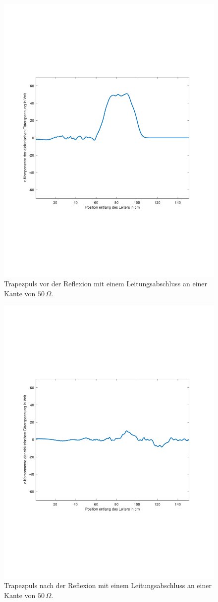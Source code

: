\documentclass[Protokollheft.tex]{subfiles}
\begin{document}
\begin{figure}[ht]
	\centering
	\includegraphics[trim = 20mm 65mm 20mm 65mm, clip,width=0.7\linewidth]{Aufgabe2_1.pdf}
	\caption{Trapezpuls vor der Reflexion mit einem Leitungsabschluss an einer Kante von $50\,\Omega$.}\label{fig:Aufg2_1}
\end{figure}
\begin{figure}[ht]
	\centering
	\includegraphics[trim = 20mm 65mm 20mm 65mm, clip,width=0.7\linewidth]{Aufgabe2_2.pdf}
	\caption{Trapezpuls nach der Reflexion mit einem Leitungsabschluss an einer Kante von $50\,\Omega$.}\label{fig:Aufg2_2}
\end{figure}
\end{document}
